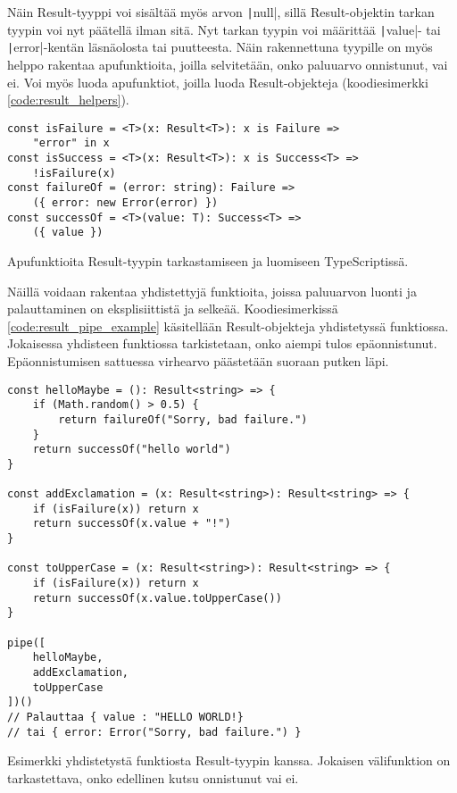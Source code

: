 Näin Result-tyyppi voi sisältää myös arvon \texttt|null|, sillä Result-objektin tarkan tyypin voi nyt päätellä ilman sitä. Nyt tarkan tyypin voi määrittää \texttt|value|- tai \texttt|error|-kentän läsnäolosta tai puutteesta. Näin rakennettuna tyypille on myös helppo rakentaa apufunktioita, joilla selvitetään, onko paluuarvo onnistunut, vai ei. Voi myös luoda apufunktiot, joilla luoda Result-objekteja (koodiesimerkki \ref{code:result_helpers}).

\begin{code}
    \begin{verbatim}
const isFailure = <T>(x: Result<T>): x is Failure => 
    "error" in x
const isSuccess = <T>(x: Result<T>): x is Success<T> => 
    !isFailure(x)
const failureOf = (error: string): Failure => 
    ({ error: new Error(error) })
const successOf = <T>(value: T): Success<T> => 
    ({ value })
    \end{verbatim}
    \caption{Apufunktioita Result-tyypin tarkastamiseen ja luomiseen TypeScriptissä.}
    \label{code:result_helpers}
\end{code}

Näillä voidaan rakentaa yhdistettyjä funktioita, joissa paluuarvon luonti ja palauttaminen on eksplisiittistä ja selkeää. Koodiesimerkissä \ref{code:result_pipe_example} käsitellään Result-objekteja yhdistetyssä funktiossa. Jokaisessa yhdisteen funktiossa tarkistetaan, onko aiempi tulos epäonnistunut. Epäonnistumisen sattuessa virhearvo päästetään suoraan putken läpi.

\begin{code}
    \begin{verbatim}
const helloMaybe = (): Result<string> => {
    if (Math.random() > 0.5) {
        return failureOf("Sorry, bad failure.")
    }
    return successOf("hello world")
}

const addExclamation = (x: Result<string>): Result<string> => {
    if (isFailure(x)) return x
    return successOf(x.value + "!")
}

const toUpperCase = (x: Result<string>): Result<string> => {
    if (isFailure(x)) return x
    return successOf(x.value.toUpperCase())
}

pipe([
    helloMaybe,
    addExclamation,
    toUpperCase
])()
// Palauttaa { value : "HELLO WORLD!}
// tai { error: Error("Sorry, bad failure.") }
    \end{verbatim}
    \caption{Esimerkki yhdistetystä funktiosta Result-tyypin kanssa. Jokaisen välifunktion on tarkastettava, onko edellinen kutsu onnistunut vai ei.}
    \label{code:result_pipe_example}
\end{code}

